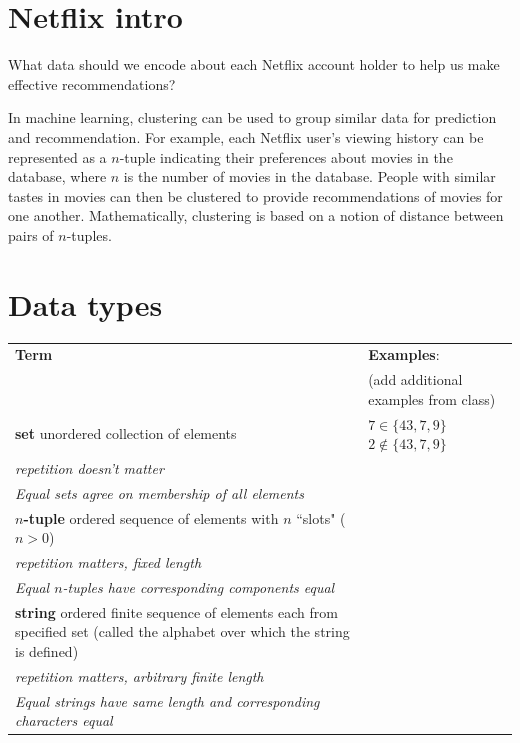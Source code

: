 \documentclass[12pt, oneside]{article}
\begin{document}
\section*{Netflix intro}


What data should we encode about each Netflix account holder to help us make effective recommendations?

\vfill
\vfill

In machine learning, clustering can be used to group similar data for prediction and recommendation.  For example,
each Netflix user's viewing history can be represented as a $n$-tuple indicating their preferences about
movies in the database, where $n$ is the number of movies in the database.  People with similar tastes in movies can then be clustered to provide recommendations
of movies for one another.  Mathematically, clustering is based on a notion of distance between pairs of $n$-tuples.
 \vfill
\section*{Data types}


\begin{center}
    \begin{tabular}{|p{4.6in}p{2.6in}|}
    \hline
    {\bf  Term} & {\bf Examples}:\\
    &  (add additional examples from class)\\
    \hline 
    {\bf set} \newline
    unordered collection of elements & $7 \in \{43, 7, 9 \}$ \qquad $2 \notin \{43, 7, 9 \}$ \\
    {\it repetition doesn't matter} & \\
    {\it Equal sets agree on membership of all elements}& \\
    \hline
    {\bf $n$-tuple} \newline
    ordered sequence of elements with $n$ ``slots" ($n >0$) & \\
    {\it repetition matters, fixed length} &\\
    {\it Equal $n$-tuples have corresponding components equal}& \\
    \hline
    {\bf string} \newline
    ordered finite sequence of elements each from specified
    set (called the alphabet over which the string is defined)& \\
    {\it repetition matters, arbitrary finite length} &\\
    {\it Equal strings have same length and corresponding characters equal}\\
    \hline
    \end{tabular}
\end{center}
\end{document}
